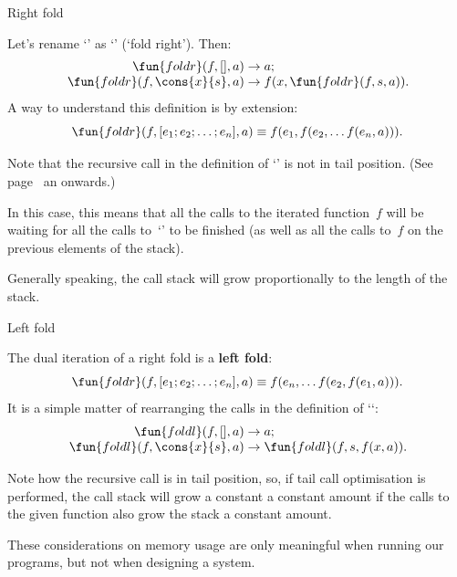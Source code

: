 %
\begin{frame}{Right fold}

  Let's rename `' as `' (`fold right'). Then:
  \begin{equation*}
    \begin{array}{r@{\;}l@{\;}l@{}}
      \fun{foldr} (f, [], a) & \rightarrow a;\\
      \fun{foldr} (f, \cons{x}{s}, a) & \rightarrow f(x, \fun{foldr}(f, s, a)).
    \end{array}
  \end{equation*}
  A way to understand this definition is by extension:
  \begin{equation*}
    \fun{foldr}(f,[e_1; e_2; \ldots; e_n], a) \equiv f(e_1, f(e_2, \ldots f(e_n, a))).
  \end{equation*}

  Note that the recursive call in the definition of `' is
  not in tail position. (See page~\pageref{tail_call} an onwards.)

  \bigskip

  In this case, this means that all the calls to the iterated
  function~$f$ will be waiting for all the calls to~`' to
  be finished (as well as all the calls to~$f$ on the previous
  elements of the stack).

  \bigskip

  Generally speaking, the call stack will grow proportionally to the
  length of the stack.

\end{frame}

%
\begin{frame}{Left fold}

  The dual iteration of a right fold is a \textbf{left fold}:
  \begin{equation*}
    \fun{foldr}(f,[e_1; e_2; \ldots; e_n], a) \equiv f(e_n, \ldots f(e_2, f(e_1, a))).
  \end{equation*}
  It is a simple matter of rearranging the calls in the definition of ``:
  \begin{equation*}
    \begin{array}{r@{\;}l@{\;}l@{}}
      \fun{foldl} (f, [], a) & \rightarrow a;\\
      \fun{foldl} (f, \cons{x}{s}, a) & \rightarrow \fun{foldl}(f, s, f(x,a)).
    \end{array}
  \end{equation*}

  Note how the recursive call is in tail position, so, if tail call
  optimisation is performed, the call stack will grow a constant a
  constant amount if the calls to the given function also grow the
  stack a constant amount.

  \bigskip

  These considerations on memory usage are only meaningful when
  running our programs, but not when designing a system.

\end{frame}

